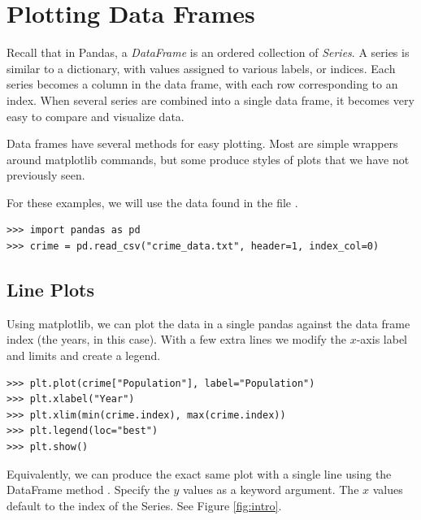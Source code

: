 \label{lab:pandas2}

\section*{Plotting Data Frames}

Recall that in Pandas, a \emph{DataFrame} is an ordered collection of \emph{Series}.
A series is similar to a dictionary, with values assigned to various labels, or indices. Each series becomes a column in the data frame, with each row corresponding to an index.
When several series are combined into a single data frame, it becomes very easy to compare and visualize data.

Data frames have several methods for easy plotting.
Most are simple wrappers around matplotlib commands, but some produce styles of plots that we have not previously seen.

For these examples, we will use the data found in the file .

\begin{lstlisting}
>>> import pandas as pd
>>> crime = pd.read_csv("crime_data.txt", header=1, index_col=0)
\end{lstlisting}

\subsection*{Line Plots}

Using matplotlib, we can plot the data in a single pandas  against the data frame index (the years, in this case).
With a few extra lines we modify the $x$-axis label and limits and create a legend.

\begin{lstlisting}
>>> plt.plot(crime["Population"], label="Population")
>>> plt.xlabel("Year")
>>> plt.xlim(min(crime.index), max(crime.index))
>>> plt.legend(loc="best")
>>> plt.show()
\end{lstlisting}

Equivalently, we can produce the exact same plot with a single line using the DataFrame method .
Specify the $y$ values as a keyword argument.
The $x$ values default to the index of the Series.
See Figure \ref{fig:intro}.

